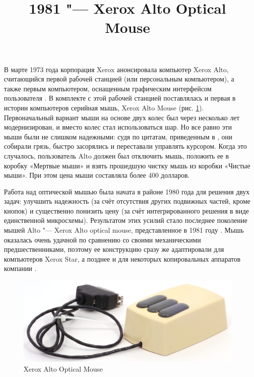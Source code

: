 \documentclass[11pt, a4paper]{article}
\begin{document}
\title{1981 "--- Xerox Alto Optical Mouse}
\date{}
\maketitle
{}

В марте 1973 года корпорация Xerox анонсировала компьютер Xerox Alto, считающийся первой рабочей станцией (или персональным компьютером), а также первым компьютером, оснащенным графическим интерфейсом пользователя \cite{wiki}. В комплекте с этой рабочей станцией поставлялась и первая в истории компьютеров серийная мышь, Xerox Alto Mouse (рис. \ref{fig:XeroxAltoPic}). Первоначальный вариант мыши на основе двух колес был через несколько лет модернизирован, и вместо колес стал использоваться шар. Но все равно эти мыши были не слишком надежными: судя по цитатам, приведенным в \cite{mouses}, они собирали грязь, быстро засорялись и переставали управлять курсором. Когда это случалось, пользователь Alto должен был отключить мышь, положить ее в коробку «Мертвые мыши» и взять прошедшую чистку мышь из коробки «Чистые мыши». При этом цена мыши составляла более 400 долларов.

Работа над оптической мышью была начата в районе 1980 года для решения двух задач: улучшить надежность (за счёт отсутствия других подвижных частей, кроме кнопок) и существенно понизить цену (за счёт интегрированного решения в виде единственной микросхемы). Результатом этих усилий стало последнее поколение мышей Alto "--- Xerox Alto optical mouse, представленное в 1981 году \cite{vlsi81}. Мышь оказалась очень удачной по сравнению со своими механическими предшественниками, поэтому ее конструкцию сразу же адаптировали для компьютеров Xerox Star, а позднее и для некоторых копировальных аппаратов компании \cite{mouses}.

\begin{figure}[h]
    \centering
    \includegraphics[scale=0.7]{1981_xerox_alto_mouse/pic_30.jpg}
    \caption{Xerox Alto Optical Mouse}
    \label{fig:XeroxAltoPic}
\end{figure}
\end{document}
